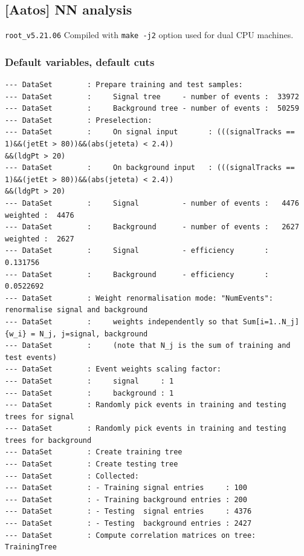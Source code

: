 \subsection{[Aatos] NN analysis}

{\tt root\_v5.21.06}
Compiled with {\tt make -j2} option used for dual CPU machines.

\subsubsection{Default variables, default cuts}
\scriptsize
\begin{verbatim}
--- DataSet        : Prepare training and test samples:
--- DataSet        :     Signal tree     - number of events :  33972
--- DataSet        :     Background tree - number of events :  50259
--- DataSet        : Preselection:
--- DataSet        :     On signal input       : (((signalTracks == 1)&&(jetEt > 80))&&(abs(jeteta) < 2.4))
&&(ldgPt > 20)                                                                                            
--- DataSet        :     On background input   : (((signalTracks == 1)&&(jetEt > 80))&&(abs(jeteta) < 2.4))
&&(ldgPt > 20)                                                                                            
--- DataSet        :     Signal          - number of events :   4476    weighted :  4476
--- DataSet        :     Background      - number of events :   2627    weighted :  2627
--- DataSet        :     Signal          - efficiency       :                   0.131756
--- DataSet        :     Background      - efficiency       :                  0.0522692
--- DataSet        : Weight renormalisation mode: "NumEvents": renormalise signal and background
--- DataSet        :     weights independently so that Sum[i=1..N_j]{w_i} = N_j, j=signal, background
--- DataSet        :     (note that N_j is the sum of training and test events)
--- DataSet        : Event weights scaling factor:
--- DataSet        :     signal     : 1
--- DataSet        :     background : 1
--- DataSet        : Randomly pick events in training and testing trees for signal
--- DataSet        : Randomly pick events in training and testing trees for background
--- DataSet        : Create training tree
--- DataSet        : Create testing tree
--- DataSet        : Collected:
--- DataSet        : - Training signal entries     : 100
--- DataSet        : - Training background entries : 200
--- DataSet        : - Testing  signal entries     : 4376
--- DataSet        : - Testing  background entries : 2427
--- DataSet        : Compute correlation matrices on tree: TrainingTree

\end{verbatim}
